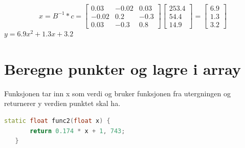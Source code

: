 \documentclass[a4paper,norsk]{article}
\begin{document}
\begin{equation*}
x = B^{-1} * c = \begin{bmatrix} 0.03 & -0.02 & 0.03 \\ -0.02 & 0.2 & -0.3 \\ 0.03 & -0.3 & 0.8 \end{bmatrix}\begin{bmatrix} 253.4 \\ 54.4 \\ 14.9\end{bmatrix}
= \begin{bmatrix}6.9 \\ 1.3 \\ 3.2 \end{bmatrix}
\end{equation*}
$y = 6.9x^{2}+1.3x+3.2$
\section{Beregne punkter og lagre i array}
Funksjonen tar inn x som verdi og bruker funksjonen fra utergningen og returnerer y verdien punktet skal ha.
\begin{lstlisting}[language=C++, caption={trianglesurface.h}]
static float func2(float x) {
       return 0.174 * x + 1, 743;
   }
\end{lstlisting}
\end{document}
